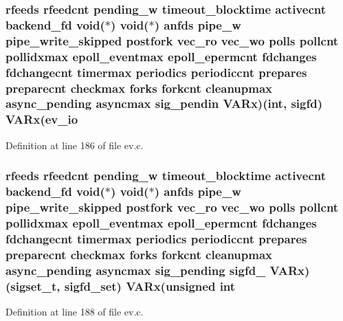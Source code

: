 \hypertarget{structev__loop_ab2bac6ae2cba492aac5528930e332c0f}{
\subsubsection[{\-V\-A\-Rx}]{ {\bf rfeeds} {\bf rfeedcnt} {\bf pending\-\_\-w} {\bf timeout\-\_\-blocktime} {\bf activecnt} {\bf backend\-\_\-fd} void($\ast$) void($\ast$) {\bf anfds} {\bf pipe\-\_\-w} {\bf pipe\-\_\-write\-\_\-skipped} {\bf postfork} {\bf vec\-\_\-ro} {\bf vec\-\_\-wo} {\bf polls} {\bf pollcnt} {\bf pollidxmax} {\bf epoll\-\_\-eventmax} {\bf epoll\-\_\-epermcnt} {\bf fdchanges} {\bf fdchangecnt} {\bf timermax} {\bf periodics} {\bf periodiccnt} {\bf prepares} {\bf preparecnt} {\bf checkmax} {\bf forks} {\bf forkcnt} {\bf cleanupmax} {\bf async\-\_\-pending} {\bf asyncmax} sig\-\_\-pendin {\bf \-V\-A\-Rx})(int, {\bf sigfd}) {\bf \-V\-A\-Rx}({\bf ev\-\_\-io}}}\label{structev__loop_ab2bac6ae2cba492aac5528930e332c0f}


\-Definition at line 186 of file ev.\-c.

\hypertarget{structev__loop_a5d87b80eb752b431d01cfb2a5a373037}{
\subsubsection[{\-V\-A\-Rx}]{ {\bf rfeeds} {\bf rfeedcnt} {\bf pending\-\_\-w} {\bf timeout\-\_\-blocktime} {\bf activecnt} {\bf backend\-\_\-fd} void($\ast$) void($\ast$) {\bf anfds} {\bf pipe\-\_\-w} {\bf pipe\-\_\-write\-\_\-skipped} {\bf postfork} {\bf vec\-\_\-ro} {\bf vec\-\_\-wo} {\bf polls} {\bf pollcnt} {\bf pollidxmax} {\bf epoll\-\_\-eventmax} {\bf epoll\-\_\-epermcnt} {\bf fdchanges} {\bf fdchangecnt} {\bf timermax} {\bf periodics} {\bf periodiccnt} {\bf prepares} {\bf preparecnt} {\bf checkmax} {\bf forks} {\bf forkcnt} {\bf cleanupmax} {\bf async\-\_\-pending} {\bf asyncmax} {\bf sig\-\_\-pending} sigfd\-\_\- {\bf \-V\-A\-Rx})(sigset\-\_\-t, {\bf sigfd\-\_\-set}) {\bf \-V\-A\-Rx}(unsigned int}}\label{structev__loop_a5d87b80eb752b431d01cfb2a5a373037}


\-Definition at line 188 of file ev.\-c.


